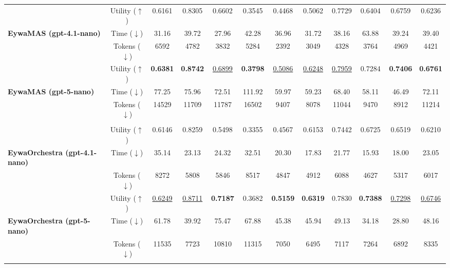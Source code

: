 \documentclass{llmxive}
\begin{document}
{\begin{table}[!t]
{\begin{tabular}{l|c|ccc|ccc|ccc|c}
        
        \addlinespace[-0.4ex] \midrule \addlinespace[-0.000ex]
        \multicolumn{12}{c}{
            \rule{0pt}{1.1em}
            \textbf{\textit{Multi-Agent Setting}}
            \rule[-0.3em]{0pt}{1.1em}
        } \\
        [-0.4ex]\midrule\addlinespace[-0.000ex]

        & Utility ($\uparrow$)   & 0.6161 & 0.8305 & 0.6602 & 0.3545 & 0.4468 & 0.5062 & 0.7729 & 0.6404 & 0.6759 & 0.6236\\
        \textbf{EywaMAS (gpt-4.1-nano)}
        & Time ($\downarrow$)  & 31.16 & 39.72 & 27.96 & 42.28 & 36.96 & 31.72 & 38.16 & 63.88 & 39.24 & 39.40\\
        & Tokens ($\downarrow$) & 6592 & 4782 & 3832 & 5284 & 2392 & 3049 & 4328 & 3764 & 4969 & 4421\\
        [-0.4ex]\midrule\addlinespace[-0.000ex]

        & Utility ($\uparrow$)   & \textbf{0.6381} & \textbf{0.8742} & \underline{0.6899} & \textbf{0.3798} & \underline{0.5086} & \underline{0.6248} & \underline{0.7959} & 0.7284 & \textbf{0.7406} & \textbf{0.6761}\\
        \textbf{EywaMAS (gpt-5-nano)}
        & Time ($\downarrow$)  & 77.25 & 75.96 & 72.51 & 111.92 & 59.97 & 59.23 & 68.40 & 58.11 & 46.49 & 72.11\\
        & Tokens ($\downarrow$) & 14529 & 11709 & 11787 & 16502 & 9407 & 8078 & 11044 & 9470 & 8912 & 11214\\
        
        \addlinespace[-0.4ex] \midrule \addlinespace[-0.000ex]
        \multicolumn{12}{c}{
            \rule{0pt}{1.1em}
            \textbf{\textit{Dynamic Orchestration}}
            \rule[-0.3em]{0pt}{1.1em}
        } \\
        [-0.4ex]\midrule\addlinespace[-0.000ex]

        & Utility ($\uparrow$)   & 0.6146 & 0.8259 & 0.5498 & 0.3355 & 0.4567 & 0.6153 & 0.7442 & 0.6725 & 0.6519 & 0.6210\\
        \textbf{EywaOrchestra (gpt-4.1-nano)}
        & Time ($\downarrow$)  & 35.14 & 23.13 & 24.32 & 32.51 & 20.30 & 17.83 & 21.77 & 15.93 & 18.00 & 23.05\\
        & Tokens ($\downarrow$) & 8272 & 5808 & 5846 & 8517 & 4847 & 4912 & 6088 & 4627 & 5317 & 6017\\
        [-0.4ex]\midrule\addlinespace[-0.000ex]

        & Utility ($\uparrow$)   & \underline{0.6249} & \underline{0.8711} & \textbf{0.7187} & 0.3682 & \textbf{0.5159} & \textbf{0.6319} & 0.7830 & \textbf{0.7388} & \underline{0.7298} & \underline{0.6746}\\
        \textbf{EywaOrchestra (gpt-5-nano)}
        & Time ($\downarrow$)  & 61.78 & 39.92 & 75.47 & 67.88 & 45.38 & 45.94 & 49.13 & 34.18 & 28.80 & 48.16\\
        & Tokens ($\downarrow$) & 11535 & 7723 & 10810 & 11315 & 7050 & 6495 & 7117 & 7264 & 6892 & 8335\\
        [-0.4ex]\bottomrule\addlinespace[-0.000ex]


\end{tabular}}
\end{table}}
\end{document}
